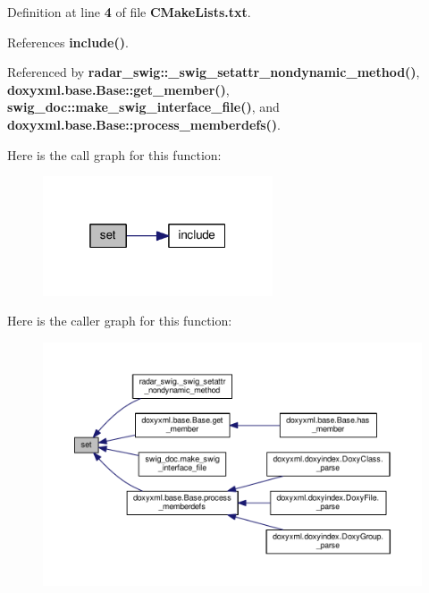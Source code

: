 Definition at line {\bf 4} of file {\bf C\+Make\+Lists.\+txt}.



References {\bf include()}.



Referenced by {\bf radar\+\_\+swig\+::\+\_\+swig\+\_\+setattr\+\_\+nondynamic\+\_\+method()}, {\bf doxyxml.\+base.\+Base\+::get\+\_\+member()}, {\bf swig\+\_\+doc\+::make\+\_\+swig\+\_\+interface\+\_\+file()}, and {\bf doxyxml.\+base.\+Base\+::process\+\_\+memberdefs()}.



Here is the call graph for this function\+:
\nopagebreak
\begin{figure}[H]
\begin{center}
\leavevmode
\includegraphics[width=193pt]{d9/dda/limesuite-dev_2src_2CMakeLists_8txt_a740c3e853e1759b963421cd1bd74c581_cgraph}
\end{center}
\end{figure}




Here is the caller graph for this function\+:
\nopagebreak
\begin{figure}[H]
\begin{center}
\leavevmode
\includegraphics[width=350pt]{d9/dda/limesuite-dev_2src_2CMakeLists_8txt_a740c3e853e1759b963421cd1bd74c581_icgraph}
\end{center}
\end{figure}


